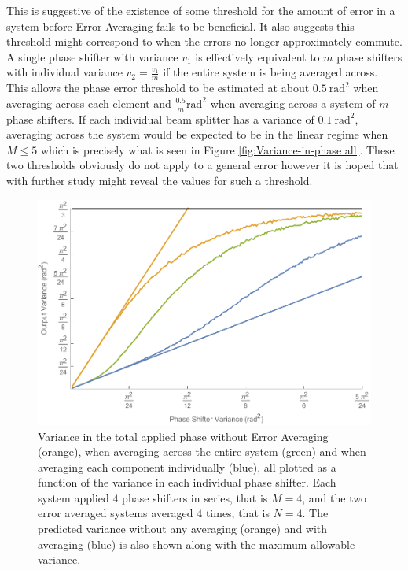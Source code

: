 \documentclass[aps,pra,twocolumn,superscriptaddress,numerical,floatfix]{revtex4-1}
\begin{document}
This is suggestive of the existence of some threshold for the amount of error in a system before Error Averaging fails to be beneficial. It also suggests this threshold might correspond to when the errors no longer approximately commute. A single phase shifter with variance $v_{1}$ is effectively equivalent to $m$ phase shifters with individual variance $v_{2}=\frac{v_{1}}{m}$ if the entire system is being averaged across. This allows the phase error threshold to be estimated at about $0.5\ \textrm{rad}^{2}$ when averaging across each element and $\frac{0.5}{m}\textrm{rad}^{2}$ when averaging across a system of $m$ phase shifters. If each individual beam splitter has a variance of $0.1\ \textrm{rad}^{2}$, averaging across the system would be expected to be in the linear regime when $M\le5$ which is precisely what is seen in Figure \ref{fig:Variance-in-phase all}. These two thresholds obviously do not apply to a general error however it is hoped that with further study might reveal the values for such a threshold.
\begin{figure}
\centerline{\includegraphics[width=\columnwidth]{variance(variance).pdf}}
\caption{Variance in the total applied phase without Error Averaging (orange), when averaging across the entire system (green) and when averaging each component individually (blue), all plotted as a function of the variance in each individual phase shifter. Each system applied $4$ phase shifters in series, that is $M=4$, and the two error averaged systems averaged $4$ times, that is $N=4$. The predicted variance without any averaging (orange) and with averaging (blue) is also shown along with the maximum allowable variance. \label{fig:Variance(veriance)}}
\end{figure}
\end{document}
